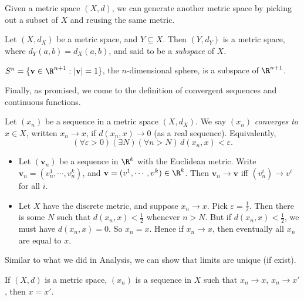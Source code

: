 \documentclass[a4paper]{article}
\begin{document}
Given a metric space $(X, d)$, we can generate another metric space by picking out a subset of $X$ and reusing the same metric.
\begin{defi}
  Let $(X, d_X)$ be a metric space, and $Y\subseteq X$. Then $(Y, d_Y)$ is a metric space, where $d_Y(a, b) = d_X(a, b)$, and said to be a \emph{subspace} of $X$.
\end{defi}

\begin{eg}
  $S^n = \{\mathbf{v}\in \R^{n + 1}: |\mathbf{v}| = 1\}$, the $n$-dimensional sphere, is a subspace of $\R^{n + 1}$.
\end{eg}

Finally, as promised, we come to the definition of convergent sequences and continuous functions.
\begin{defi}
  Let $(x_n)$ be a sequence in a metric space $(X, d_X)$. We say $(x_n)$ \emph{converges to} $x\in X$, written $x_n \to x$, if $d(x_n, x) \to 0$ (as a real sequence). Equivalently,
  \[
    (\forall \varepsilon > 0)(\exists N)(\forall n > N)\, d(x_n, x) < \varepsilon.
  \]
\end{defi}
\begin{eg}\leavevmode
  \begin{itemize}
    \item Let $(\mathbf{v}_n)$ be a sequence in $\R^k$ with the Euclidean metric. Write $\mathbf{v}_n = (v_n^1, \cdots, v_n^k)$, and $\mathbf{v} = (v^1, \cdots, v^k)\in \R^k$. Then $\mathbf{v}_n \to \mathbf{v}$ iff $(v_n^i) \to v^i$ for all $i$.

    \item Let $X$ have the discrete metric, and suppose $x_n \to x$. Pick $\varepsilon = \frac{1}{2}$. Then there is some $N$ such that $d(x_n, x) < \frac{1}{2}$ whenever $n > N$. But if $d(x_n, x) < \frac{1}{2}$, we must have $d(x_n, x) = 0$. So $x_n = x$. Hence if $x_n \to x$, then eventually all $x_n$ are equal to $x$.

  \end{itemize}
\end{eg}

Similar to what we did in Analysis, we can show that limits are unique (if exist).
\begin{prop}
  If $(X, d)$ is a metric space, $(x_n)$ is a sequence in $X$ such that $x_n \to x$, $x_n \to x'$, then $x = x'$.
\end{prop}
\end{document}
